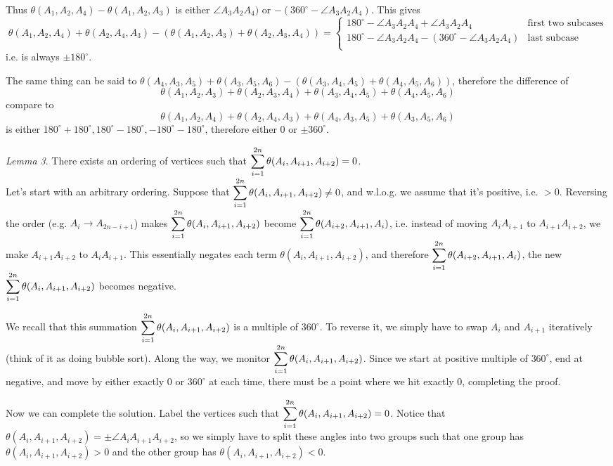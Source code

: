 \documentclass[11pt,a4paper]{article}
\begin{document}
\begin{enumerate}
	Thus $\theta(A_1, A_2, A_4)-\theta(A_1, A_2, A_3)$ is either $\angle A_3A_2A_4)$ or $-(360^{\circ} - \angle A_3A_2A_4)$. This gives 
	\[
	\theta(A_1, A_2, A_4)+\theta(A_2, A_4, A_3) - (\theta(A_1, A_2, A_3)+\theta(A_2, A_3, A_4))=\begin{cases}
		180^{\circ} - \angle A_3A_2A_4 + \angle A_3A_2A_4 & \text{first two subcases}\\
		180^{\circ} - \angle A_3A_2A_4 -(360^{\circ} - \angle A_3A_2A_4)& \text{last subcase}\\
	\end{cases}
	\]
	i.e. is always $\pm 180^{\circ}$. 
	
	The same thing can be said to $\theta(A_4, A_3, A_5) + \theta (A_3, A_5, A_6)- (\theta(A_3, A_4, A_5) + \theta (A_4, A_5, A_6))$, therefore the difference of 
	\[
	\theta(A_1, A_2, A_3)+\theta(A_2, A_3, A_4)+\theta(A_3, A_4, A_5) + \theta (A_4, A_5, A_6)
	\]
	compare to 
	\[
	\theta(A_1, A_2, A_4)+\theta(A_2, A_4, A_3)+\theta(A_4, A_3, A_5) + \theta (A_3, A_5, A_6)
	\]
	is either $180^{\circ}+180^{\circ}, 180^{\circ}-180^{\circ}, -180^{\circ}-180^{\circ}$, therefore either 0 or $\pm 360^{\circ}$. 
	
	\emph{Lemma 3}. There exists an ordering of vertices such that $\displaystyle\sum_{i=1}^{2n}\theta(A_i, A_{i+1}, A_{i+2})=0$. \\
	Let's start with an arbitrary ordering. Suppose that $\displaystyle\sum_{i=1}^{2n}\theta(A_i, A_{i+1}, A_{i+2})\neq 0$, and w.l.o.g. we assume that it's positive, i.e. $>0$. Reversing the order (e.g. $A_{i}\to A_{2n-i+1}$) makes $\displaystyle\sum_{i=1}^{2n}\theta(A_i, A_{i+1}, A_{i+2})$ become $\displaystyle\sum_{i=1}^{2n}\theta(A_{i+2}, A_{i+1}, A_{i})$, i.e. instead of moving $A_iA_{i+1}$ to $A_{i+1}A_{i+2}$, we make $A_{i+1}A_{i+2}$ to $A_iA_{i+1}$. This essentially negates each term $\theta(A_i, A_{i+1}, A_{i+2})$, and therefore $\displaystyle\sum_{i=1}^{2n}\theta(A_{i+2}, A_{i+1}, A_{i})$, the new $\displaystyle\sum_{i=1}^{2n}\theta(A_i, A_{i+1}, A_{i+2})$ becomes negative. 
	
	We recall that this summation $\displaystyle\sum_{i=1}^{2n}\theta(A_i, A_{i+1}, A_{i+2})$ is a multiple of $360^{\circ}$. To reverse it, we simply have to swap $A_i$ and $A_{i+1}$ iteratively (think of it as doing bubble sort). Along the way, we monitor $\displaystyle\sum_{i=1}^{2n}\theta(A_i, A_{i+1}, A_{i+2})$. Since we start at positive multiple of $360^{\circ}$, end at negative, and move by either exactly 0 or $360^{\circ}$ at each time, there must be a point where we hit exactly 0, completing the proof. 
	
	Now we can complete the solution. Label the vertices such that $\displaystyle\sum_{i=1}^{2n}\theta(A_i, A_{i+1}, A_{i+2})=0$. Notice that $\theta(A_i, A_{i+1}, A_{i+2})=\pm \angle A_iA_{i+1}A_{i+2}$, so we simply have to split these angles into two groups such that one group has $\theta(A_i, A_{i+1}, A_{i+2})>0$ and the other group has $\theta(A_i, A_{i+1}, A_{i+2})<0$. 
	

\end{enumerate}
\end{document}
